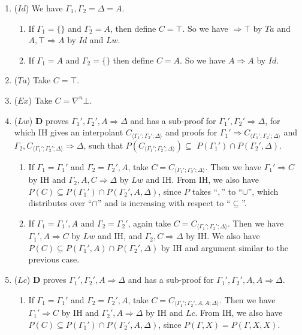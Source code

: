 \begin{enumerate}
	\item ($Id$) We have $\Gamma_1,\Gamma_2 = \Delta = A$.
	\begin{enumerate}
		\item If $\Gamma_1 = \{\}$ and $\Gamma_2 = A$, then define $C = \top$. So we have $\Rightarrow \top$ by $Ta$ and $A , \top \Rightarrow A$ by $Id$ and $Lw$.
		
		\item If $\Gamma_1 = A$ and $\Gamma_2 = \{\}$ then define $C = A$. So we have $A \Rightarrow A$ by $Id$.
	\end{enumerate}
	\item ($Ta$) Take $C = \top$.
	
	\item ($Ex$) Take $C = \nabla^n \bot$.
	
	\item ($Lw$) $\mathbf{D}$ proves $\Gamma_1' , \Gamma_2' , A \Rightarrow \Delta$ and has a sub-proof for $\Gamma_1' , \Gamma_2' \Rightarrow \Delta$, for which IH gives an interpolant $C_{\langle\Gamma_1';\Gamma_2';\Delta\rangle}$ and proofs for $\Gamma_1' \Rightarrow C_{\langle\Gamma_1';\Gamma_2';\Delta\rangle}$ and $\Gamma_2 , C_{\langle\Gamma_1';\Gamma_2';\Delta\rangle} \Rightarrow \Delta$, such that $P(C_{\langle\Gamma_1';\Gamma_2';\Delta\rangle}) \subseteq$ $ P(\Gamma_1') \cap P(\Gamma_2' , \Delta)$.
	\begin{enumerate}
		\item If $\Gamma_1 = \Gamma_1'$ and $\Gamma_2 = \Gamma_2' , A$, take $C = C_{\langle\Gamma_1';\Gamma_2';\Delta\rangle}$. Then we have  $\Gamma_1' \Rightarrow C$ by IH and $\Gamma_2 , A , C \Rightarrow \Delta$ by $Lw$ and IH. From IH, we also have $P(C) \subseteq P(\Gamma_1') \cap P(\Gamma_2' , A , \Delta)$, since $P$ takes ``$,$'' to ``$\cup$'', which distributes over ``$\cap$'' and is increasing with respect to ``$\subseteq$''.
		
		\item If $\Gamma_1 = \Gamma_1' , A$ and $\Gamma_2 = \Gamma_2'$, again take $C = C_{\langle\Gamma_1';\Gamma_2';\Delta\rangle}$. Then we have  $\Gamma_1' , A \Rightarrow C$ by $Lw$ and IH, and $\Gamma_2 , C \Rightarrow \Delta$ by IH. We also have $P(C) \subseteq P(\Gamma_1' , A) \cap P(\Gamma_2' , \Delta)$ by IH and argument similar to the previous case.
	\end{enumerate}

	\item ($Lc$) $\mathbf{D}$ proves $\Gamma_1' , \Gamma_2' , A \Rightarrow \Delta$ and has a sub-proof for $\Gamma_1' , \Gamma_2' , A , A \Rightarrow \Delta$.
	\begin{enumerate}
		\item If $\Gamma_1 = \Gamma_1'$ and $\Gamma_2 = \Gamma_2' , A$, take $C = C_{\langle\Gamma_1';\Gamma_2',A,A;\Delta\rangle}$. Then we have $\Gamma_1' \Rightarrow C$ by IH and $\Gamma_2' , A \Rightarrow \Delta$ by IH and $Lc$. From IH, we also have $P(C) \subseteq P(\Gamma_1') \cap P(\Gamma_2',A,\Delta)$, since $P(\Gamma,X) = P(\Gamma,X,X)$.
		

\end{enumerate}
\end{enumerate}
